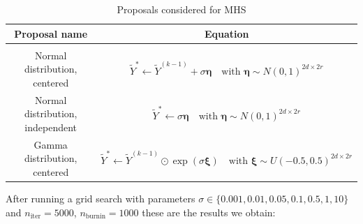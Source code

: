 \documentclass[12pt]{memoir}
\newcommand{\nitern}[1]{$n_{\text{iter}}=#1$}
\newcommand{\nburninn}[1]{$n_{\text{burnin}}=#1$}
\begin{document}
\begin{table}[H]


    \begin{center}

        \begin{tabular}{|c|c|}

            \hline

            Proposal name & Equation\\

            \hline\hline

             & \\[-10pt]

            Normal distribution, centered & $\tilde Y^* \gets \tilde Y^{(k-1)} + \sigma \boldsymbol{\eta} \quad\text{with } \boldsymbol{\eta} \sim N(0,1)^{2d\times 2r}$\\

            Normal distribution, independent & $\tilde Y^* \gets \sigma \boldsymbol{\eta} \quad\text{with } \boldsymbol{\eta} \sim N(0, 1)^{2d \times 2r}$\\

            Gamma distribution, centered & $\tilde Y^* \gets \tilde Y^{(k-1)} \odot \exp (\sigma\boldsymbol{\xi})\quad \text{with } \boldsymbol{\xi} \sim U(-0.5, 0.5)^{2d\times 2r}$\\\hline

        \end{tabular}

\end{center}

\caption{Proposals considered for MHS}

\label{table:proposal-comp-mhs}

\end{table}


After running a grid search with parameters $\sigma\in \{0.001, 0.01, 0.05, 0.1, 0.5, 1, 10\}$ and \nitern{5000}, \nburninn{1000} these are the results we obtain:
\end{document}

